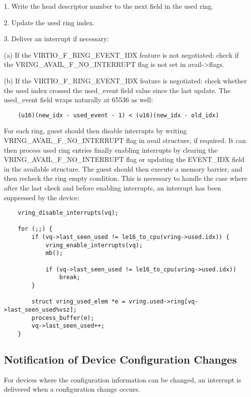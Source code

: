1. Write the head descriptor number to the next field in the used
  ring.

2. Update the used ring index.

3. Deliver an interrupt if necessary:

  (a) If the VIRTIO_F_RING_EVENT_IDX feature is not negotiated:
    check if the VRING_AVAIL_F_NO_INTERRUPT flag is not set in
    avail->flags.

  (b) If the VIRTIO_F_RING_EVENT_IDX feature is negotiated: check
    whether the used index crossed the used_event field value
    since the last update. The used_event field wraps naturally
    at 65536 as well:
\begin{lstlisting}
	(u16)(new_idx - used_event - 1) < (u16)(new_idx - old_idx)
\end{lstlisting}

For each ring, guest should then disable interrupts by writing
VRING_AVAIL_F_NO_INTERRUPT flag in avail structure, if required.
It can then process used ring entries finally enabling interrupts
by clearing the VRING_AVAIL_F_NO_INTERRUPT flag or updating the
EVENT_IDX field in the available structure.  The guest should then
execute a memory barrier, and then recheck the ring empty
condition. This is necessary to handle the case where after the
last check and before enabling interrupts, an interrupt has been
suppressed by the device:

\begin{lstlisting}
	vring_disable_interrupts(vq);

	for (;;) {
		if (vq->last_seen_used != le16_to_cpu(vring->used.idx)) {
			vring_enable_interrupts(vq);
			mb();

			if (vq->last_seen_used != le16_to_cpu(vring->used.idx))
				break;
		}

		struct vring_used_elem *e = vring.used->ring[vq->last_seen_used%vsz];
		process_buffer(e);
		vq->last_seen_used++;
	}
\end{lstlisting}

\subsection{Notification of Device Configuration Changes}\label{sec:General Initialization And Device Operation / Device Operation / Notification of Device Configuration Changes}

For devices where the configuration information can be changed, an
interrupt is delivered when a configuration change occurs.



